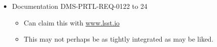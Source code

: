 \begin{itemize}
\item Documentation DMS-PRTL-REQ-0122 to 24
\begin{itemize}
\item  Can claim this with \url{www.lsst.io}
\item This may not perhaps be  as tightly integrated as may be liked.
\end{itemize}
\end{itemize}

